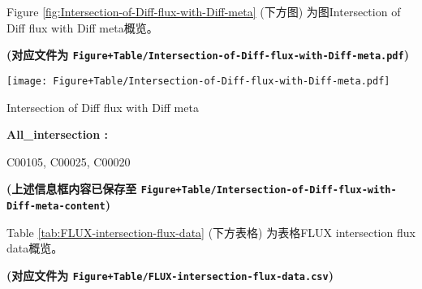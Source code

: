 \documentclass[
]{article}
\begin{document}
Figure \ref{fig:Intersection-of-Diff-flux-with-Diff-meta} (下方图) 为图Intersection of Diff flux with Diff meta概览。

\textbf{(对应文件为 \texttt{Figure+Table/Intersection-of-Diff-flux-with-Diff-meta.pdf})}

\def\@captype{figure}
\begin{center}
\texttt{[image: Figure+Table/Intersection-of-Diff-flux-with-Diff-meta.pdf]}
\caption{Intersection of Diff flux with Diff meta}\label{fig:Intersection-of-Diff-flux-with-Diff-meta}
\end{center}

\begin{center}\vspace{1.5cm}\end{center}\begin{center}\begin{tcolorbox}[colback=gray!10, colframe=gray!50, width=0.9\linewidth, arc=1mm, boxrule=0.5pt]
\textbf{
All\_intersection
:}

\vspace{0.5em}

    C00105, C00025, C00020

\vspace{2em}
\end{tcolorbox}
\end{center}

\textbf{(上述信息框内容已保存至 \texttt{Figure+Table/Intersection-of-Diff-flux-with-Diff-meta-content})}

\begin{center}\vspace{1.5cm}\end{center}

Table \ref{tab:FLUX-intersection-flux-data} (下方表格) 为表格FLUX intersection flux data概览。

\textbf{(对应文件为 \texttt{Figure+Table/FLUX-intersection-flux-data.csv})}
\end{document}
